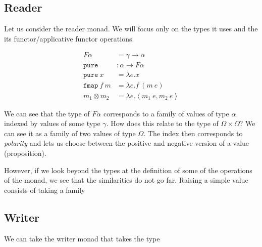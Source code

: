 \documentclass[a4paper,11pt,DIV=12]{scrartcl}
\begin{document}
\subsection{Reader}

Let us consider the reader monad. We will focus only on the types it
uses and the its functor/applicative functor operations.

\begin{align*}
  F \alpha &= \gamma \to \alpha \\
  \texttt{pure} &: \alpha \to F \alpha \\
  \texttt{pure}\ x &= \lambda e. x \\
  \texttt{fmap}\ f\ m &= \lambda e. f\ (m\ e) \\
  m_1 \otimes m_2 &= \lambda e. \left<m_1\ e, m_2\ e\right>
\end{align*}

We can see that the type of $F \alpha$ corresponds to a family of values of
type $\alpha$ indexed by values of some type $\gamma$. How does this relate
to the type of $\Omega \times \Omega$? We can see it as a family of two
values of type $\Omega$. The index then corresponds to \emph{polarity} and
lets us choose between the positive and negative version of a value
(proposition).

However, if we look beyond the types at the definition of some of the
operations of the monad, we see that the similarities do not go
far. Raising a simple value consists of taking a family 

\subsection{Writer}

We can take the writer monad that takes the type 



\end{document}
